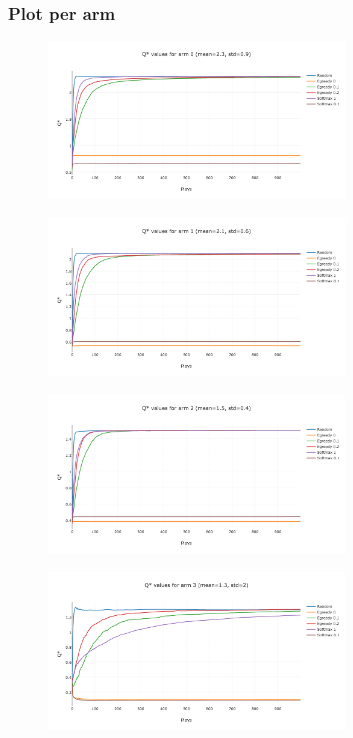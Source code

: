 \documentclass[11pt]{article}
\begin{document}
\subsubsection{Plot per arm}

\begin{figure}[H]
   \centering
   \includegraphics[width=0.7\textwidth]{img/1-1/q1.png}
\end{figure}

\begin{figure}[H]
   \centering
   \includegraphics[width=0.7\textwidth]{img/1-1/q2.png}
\end{figure}

\begin{figure}[H]
   \centering
   \includegraphics[width=0.7\textwidth]{img/1-1/q3.png}
\end{figure}


\begin{figure}[H]
   \centering
   \includegraphics[width=0.7\textwidth]{img/1-1/q4.png}
\end{figure}
\end{document}
